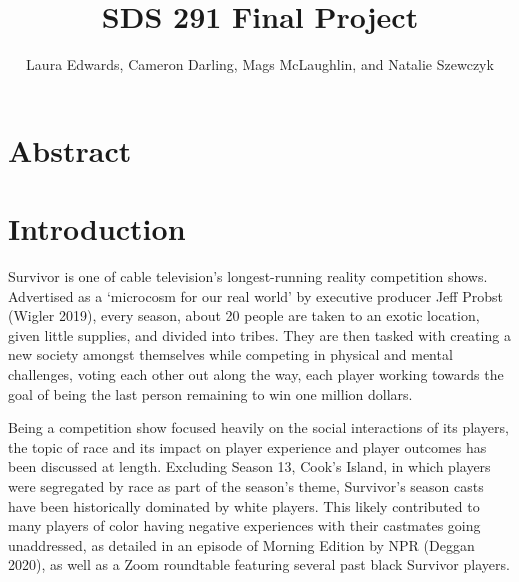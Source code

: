 \documentclass[
  letterpaper,
  DIV=11,
  numbers=noendperiod,
  oneside]{scrartcl}
\title{SDS 291 Final Project}
\author{Laura Edwards, Cameron Darling, Mags McLaughlin, and Natalie
Szewczyk}
\date{}
\begin{document}
\maketitle
\ifdefined\Shaded\renewenvironment{Shaded}{\begin{tcolorbox}[borderline west={3pt}{0pt}{shadecolor}, enhanced, interior hidden, frame hidden, breakable, sharp corners, boxrule=0pt]}{\end{tcolorbox}}\fi

\hypertarget{abstract}{%
\section{Abstract}\label{abstract}}

\hypertarget{introduction}{%
\section{Introduction}\label{introduction}}

Survivor is one of cable television's longest-running reality
competition shows. Advertised as a `microcosm for our real world' by
executive producer Jeff Probst (Wigler 2019), every season, about 20
people are taken to an exotic location, given little supplies, and
divided into tribes. They are then tasked with creating a new society
amongst themselves while competing in physical and mental challenges,
voting each other out along the way, each player working towards the
goal of being the last person remaining to win one million dollars.

Being a competition show focused heavily on the social interactions of
its players, the topic of race and its impact on player experience and
player outcomes has been discussed at length. Excluding Season 13,
Cook's Island, in which players were segregated by race as part of the
season's theme, Survivor's season casts have been historically dominated
by white players. This likely contributed to many players of color
having negative experiences with their castmates going unaddressed, as
detailed in an episode of Morning Edition by NPR (Deggan 2020), as well
as a Zoom roundtable featuring several past black Survivor players.
\end{document}
